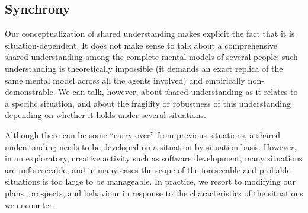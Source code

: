 \subsection{Synchrony}

Our conceptualization of shared understanding makes explicit the fact that it is situation-dependent. It does not make sense to talk about a comprehensive shared understanding among the complete mental models of several people: such understanding is theoretically impossible (it demands an exact replica of the same mental model across all the agents involved) and empirically non-demonstrable. We can talk, however, about shared understanding as it relates to a specific situation, and about the fragility or robustness of this understanding depending on whether it holds under several situations.

Although there can be some ``carry over'' from previous situations, a shared understanding needs to be developed on a situation-by-situation basis. However, in an exploratory, creative activity such as software development, many situations are unforeseeable, and in many cases the scope of the foreseeable and probable situations is too large to be manageable. In practice, we resort to modifying our plans, prospects, and behaviour in response to the characteristics of the situations we encounter \cite{Suchman1987}.

